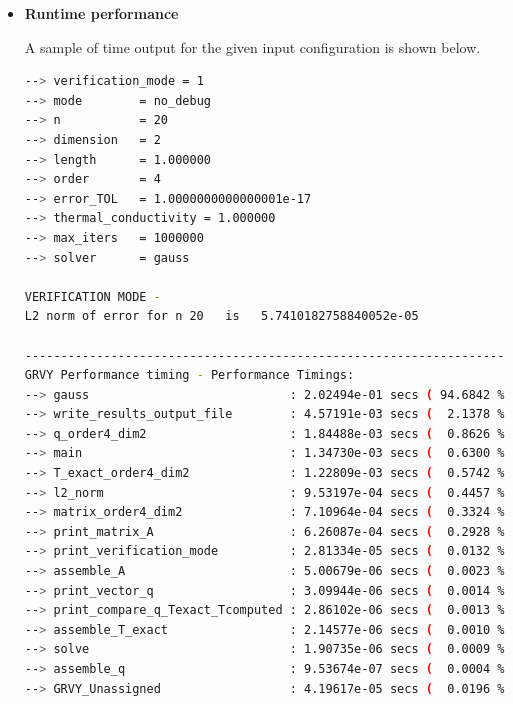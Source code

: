 \documentclass[12 pt, final]{article}
\begin{document}
\begin{itemize}
    \item \textbf{Runtime performance}
    
    A sample of time output for the given input configuration is shown below.
    \begin{lstlisting}[language=bash, basicstyle=\tiny]
--> verification_mode = 1
--> mode        = no_debug
--> n           = 20
--> dimension   = 2
--> length      = 1.000000
--> order       = 4
--> error_TOL   = 1.0000000000000001e-17
--> thermal_conductivity = 1.000000
--> max_iters   = 1000000
--> solver      = gauss

VERIFICATION MODE -
L2 norm of error for n 20   is   5.7410182758840052e-05

------------------------------------------------------------------------------------------------------------
GRVY Performance timing - Performance Timings:                       |      Mean      Variance       Count
--> gauss                            : 2.02494e-01 secs ( 94.6842 %) | [2.02494e-01  0.00000e+00          1]
--> write_results_output_file        : 4.57191e-03 secs (  2.1378 %) | [4.57191e-03  0.00000e+00          1]
--> q_order4_dim2                    : 1.84488e-03 secs (  0.8626 %) | [1.84488e-03  0.00000e+00          1]
--> main                             : 1.34730e-03 secs (  0.6300 %) | [1.34730e-03  0.00000e+00          1]
--> T_exact_order4_dim2              : 1.22809e-03 secs (  0.5742 %) | [1.22809e-03  0.00000e+00          1]
--> l2_norm                          : 9.53197e-04 secs (  0.4457 %) | [7.93670e-07  2.06032e-13       1201]
--> matrix_order4_dim2               : 7.10964e-04 secs (  0.3324 %) | [7.10964e-04  0.00000e+00          1]
--> print_matrix_A                   : 6.26087e-04 secs (  0.2928 %) | [6.26087e-04  0.00000e+00          1]
--> print_verification_mode          : 2.81334e-05 secs (  0.0132 %) | [2.81334e-05  0.00000e+00          1]
--> assemble_A                       : 5.00679e-06 secs (  0.0023 %) | [5.00679e-06  0.00000e+00          1]
--> print_vector_q                   : 3.09944e-06 secs (  0.0014 %) | [3.09944e-06  0.00000e+00          1]
--> print_compare_q_Texact_Tcomputed : 2.86102e-06 secs (  0.0013 %) | [2.86102e-06  0.00000e+00          1]
--> assemble_T_exact                 : 2.14577e-06 secs (  0.0010 %) | [2.14577e-06  0.00000e+00          1]
--> solve                            : 1.90735e-06 secs (  0.0009 %) | [1.90735e-06  0.00000e+00          1]
--> assemble_q                       : 9.53674e-07 secs (  0.0004 %) | [9.53674e-07  0.00000e+00          1]
--> GRVY_Unassigned                  : 4.19617e-05 secs (  0.0196 %)


\end{lstlisting}
\end{itemize}
\end{document}
